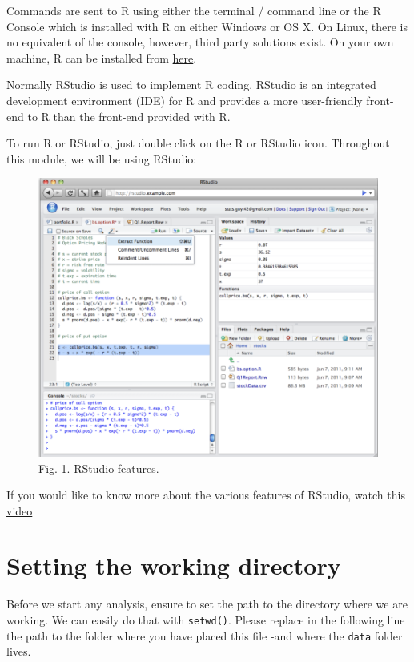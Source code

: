 \documentclass[
]{book}
\begin{document}
Commands are sent to R using either the terminal / command line or the R Console which is installed with R on either Windows or OS X. On Linux, there is no equivalent of the console, however, third party solutions exist. On your own machine, R can be installed from \href{https://www.r-project.org/}{here}.

Normally RStudio is used to implement R coding. RStudio is an integrated development environment (IDE) for R and provides a more user-friendly front-end to R than the front-end provided with R.

To run R or RStudio, just double click on the R or RStudio icon. Throughout this module, we will be using RStudio:

\begin{figure}
\centering
\includegraphics{figs/ch2/rstudio_features.png}
\caption{Fig. 1. RStudio features.}
\end{figure}

If you would like to know more about the various features of RStudio, watch this \href{https://rstudio.com/products/rstudio/}{video}

\hypertarget{setting-the-working-directory}{%
\section{Setting the working directory}\label{setting-the-working-directory}}

Before we start any analysis, ensure to set the path to the directory where we are working. We can easily do that with \texttt{setwd()}. Please replace in the following line the path to the folder where you have placed this file -and where the \texttt{data} folder lives.
\end{document}
